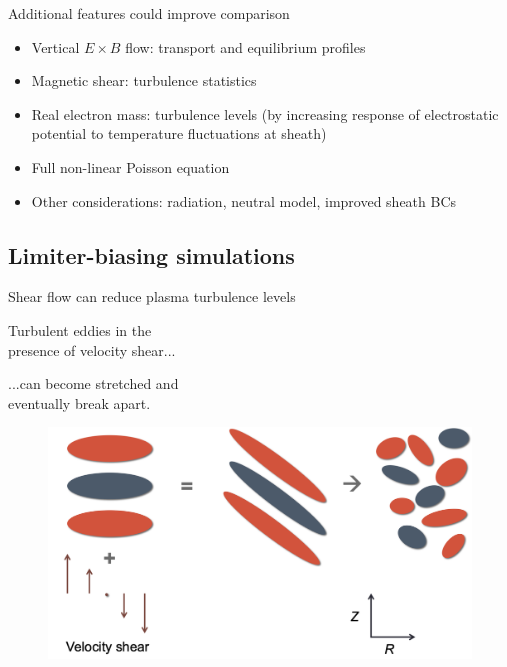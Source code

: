 \documentclass[12pt,table]{beamer}
\begin{document}
\begin{frame}{Additional features could improve comparison}
    \begin{itemize}
        \item Vertical $E \times B$ flow: transport and equilibrium profiles
        \item Magnetic shear: turbulence statistics
        \item Real electron mass: turbulence levels (by increasing response of electrostatic potential to temperature fluctuations at sheath)
        \item Full non-linear Poisson equation
        \item Other considerations: radiation, neutral model, improved sheath BCs
    \end{itemize}
\end{frame}

\subsection{Limiter-biasing simulations}
\begin{frame}{Shear flow can reduce plasma turbulence levels}
\vspace{.5cm}
\begin{minipage}{.4\linewidth}
\centering
Turbulent eddies in the \\ presence of velocity shear...
\end{minipage}
\hfill
\begin{minipage}{.5\linewidth}
\centering
...can become stretched and \\ eventually break apart.
\end{minipage}
    \begin{figure}
        \centering
        \includegraphics[width=.9\linewidth]{figs/shear-cartoon.png}
    \end{figure}
\end{frame}
\end{document}
